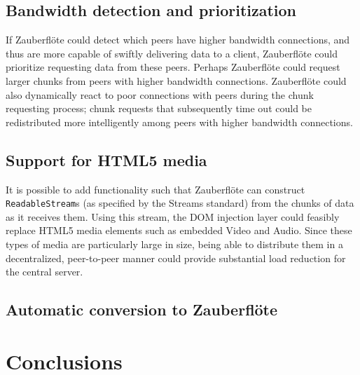 \documentclass[letterpaper,twocolumn,10pt]{article}
\newcommand{\zbf}{Zauberfl\"{o}te\xspace}
\begin{document}
\subsection{Bandwidth detection and prioritization}

If \zbf could detect which peers have higher bandwidth connections, and thus
are more capable of swiftly delivering data to a client, \zbf could prioritize
requesting data from these peers. Perhaps \zbf could request larger chunks from
peers with higher bandwidth connections. \zbf could also dynamically react to
poor connections with peers during the chunk requesting process; chunk requests
that subsequently time out could be redistributed more intelligently among
peers with higher bandwidth connections.

\subsection{Support for HTML5 media}
It is possible to add functionality such that \zbf can construct \texttt{ReadableStream}s (as specified by the Streams standard) %
from the chunks of data as it receives them. Using this stream, the DOM injection layer could feasibly replace HTML5 media elements such as embedded Video and Audio. Since these types of media are particularly large in size, being able to distribute them in a decentralized, peer-to-peer manner could provide substantial load reduction for the central server.

\subsection{Automatic conversion to \zbf}

\section{Conclusions}



{\footnotesize 
}
\end{document}

